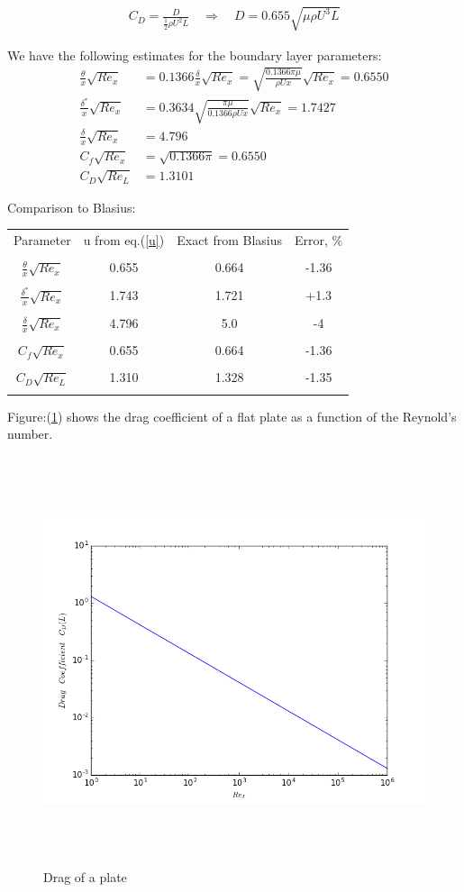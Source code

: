\documentclass[a4paper,10pt]{book}
\begin{document}
\begin{align}
C_D = \frac{D}{\frac{1}{2} \rho U^2 L} \quad \Rightarrow \quad D = 0.655\sqrt{\mu \rho U^3 L} \label{D}
\end{align}

We have the following estimates for the boundary layer parameters:
\begin{align*}
\frac{\theta}{x} \sqrt{Re_x} &= 0.1366 \frac{\delta}{x} \sqrt{Re_x} 
= \sqrt{\frac{0.1366 \pi \mu}{\rho U x}} \sqrt{Re_x} = 0.6550\\
\frac{\delta^*}{x} \sqrt{Re_x} &= 0.3634 \sqrt{\frac{\pi \mu}{0.1366 \rho U x}} \sqrt{Re_x} = 1.7427\\
\frac{\delta}{x} \sqrt{Re_x} &= 4.796\\
C_f \sqrt{Re_x} &= \sqrt{0.1366 \pi} = 0.6550\\
C_D \sqrt{Re_L} &= 1.3101
\end{align*}

Comparison to Blasius:

\begin{table}[H]
\centering
\label{comparison}
\begin{tabular}{c c c c}
  \toprule
Parameter & u from eq.(\ref{u}) & Exact from Blasius & Error, \% \\\\ \hline
  \midrule
$\frac{\theta}{x} \sqrt{Re_x}$ & 0.655 & 0.664 & -1.36  \\\\
$\frac{\delta^*}{x} \sqrt{Re_x}$ & 1.743 & 1.721 &  +1.3 \\\\
$\frac{\delta}{x} \sqrt{Re_x}$ & 4.796 & 5.0 & -4 \\\\
$C_f \sqrt{Re_x}$ & 0.655 & 0.664 & -1.36 \\\\
$C_D \sqrt{Re_L}$ & 1.310 & 1.328 & -1.35 \\\\ \hline
  \bottomrule
\end{tabular}
\end{table}

\newpage

Figure:(\ref{fig:1}) shows the drag coefficient of a flat plate as a function of the Reynold's number.
\begin{figure}[H]
    \centering
    \includegraphics[width=14cm, height=12cm]{fig1.png}
    \caption{Drag of a plate}
    \label{fig:1}
\end{figure}
\end{document}
